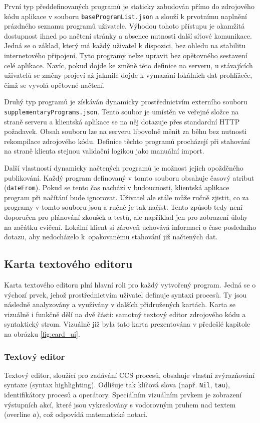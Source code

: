 První typ předdefinovaných programů je staticky zabudován přímo do zdrojového kódu aplikace v souboru \texttt{baseProgramList.json} a slouží k prvotnímu naplnění prázdného seznamu programů uživatele. 
Výhodou tohoto přístupu je okamžitá dostupnost ihned po načtení stránky a absence nutnosti další síťové komunikace. 
Jedná se o základ, který má každý uživatel k dispozici, bez ohledu na stabilitu internetového připojení. 
Tyto programy nelze upravit bez opětovného sestavení celé aplikace. 
Navíc, pokud dojde ke změně této definice na serveru, u stávajících uživatelů se změny projeví až jakmile dojde k vymazání lokálních dat prohlížeče, čímž se vyvolá opětovné načtení.

Druhý typ programů je získáván dynamicky prostřednictvím externího souboru\\\texttt{supplementaryPrograms.json}. 
Tento soubor je umístěn ve veřejné složce na straně serveru a klientská aplikace se na něj dotazuje přes standardní HTTP požadavek. 
Obsah souboru lze na serveru libovolně měnit za běhu bez nutnosti rekompilace zdrojového kódu. 
Definice těchto programů procházejí při stahování na straně klienta stejnou validační logikou jako manuální import.

Další vlastností dynamicky načtených programů je možnost jejich opožděného publikování. 
Každý program definovaný v tomto souboru obsahuje časový atribut (\texttt{dateFrom}). 
Pokud se tento čas nachází v budoucnosti, klientská aplikace program při načítání bude ignorovat.
Uživatel ale stále může ručně zjistit, co za programy v tomto souboru jsou a ručně je tak načíst.
Tento způsob tedy není doporučen pro plánování zkoušek a testů, ale například jen pro zobrazení úlohy na začátku cvičení.
Lokální klient si zároveň uchovává informaci o čase posledního dotazu, aby nedocházelo k~opakovanému stahování již načtených dat.

\subsection{Karta textového editoru}
Karta textového editoru plní hlavní roli pro každý vytvořený program. 
Jedná se o výchozí prvek, jehož prostřednictvím uživatel definuje syntaxi procesů. 
Ty jsou následně analyzovány a využívány v dalších přidružených kartách. 
Karta se vizuálně i funkčně dělí na dvě části: samotný textový editor zdrojového kódu a syntaktický strom. 
Vizuálně již byla tato karta prezentována v předešlé kapitole na obrázku \ref{fig:card_ui}.

\subsubsection*{Textový editor}
Textový editor, sloužící pro zadávání CCS procesů, obsahuje vlastní zvýrazňování syntaxe (syntax highlighting). 
Odlišuje tak klíčová slova (např. \texttt{Nil}, \texttt{tau}), identifikátory procesů a operátory. 
Speciálním vizuálním prvkem je zobrazení výstupních akcí, které jsou vykreslovány s vodorovným pruhem nad textem (overline $\overline{a}$), což odpovídá matematické notaci. 

